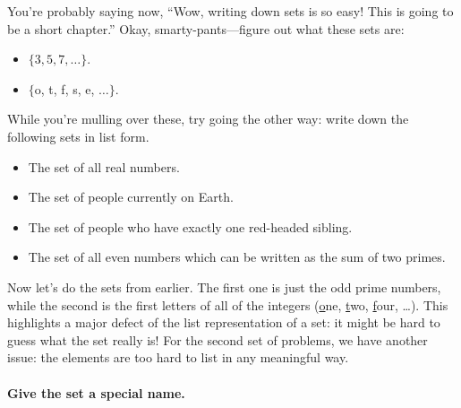 \documentclass{tufte-book}
\begin{document}
You're probably saying now, ``Wow, writing down sets is so easy! This is going to be a short chapter.'' Okay, smarty-pants---figure out what these sets are:
\begin{itemize}
    \item $\{3, 5, 7, \dots\}$.
    \item $\{$o, t, f, s, e, $\dots\}$.
\end{itemize}
While you're mulling over these, try going the other way: write down the following sets in list form.
\begin{itemize}
    \item The set of all real numbers.
    \item The set of people currently on Earth.
    \item The set of people who have exactly one red-headed sibling.
    \item The set of all even numbers which can be written as the sum of two primes.
\end{itemize}
Now let's do the sets from earlier. The first one is just the odd prime numbers, while the second is the first letters of all of the integers (\underline{o}ne, \underline{t}wo, \underline{f}our, \dots). This highlights a major defect of the list representation of a set: it might be hard to guess what the set really is! For the second set of problems, we have another issue: the elements are too hard to list in any meaningful way.

\paragraph{Give the set a special name.}
\label{sec:give-set-special}
\end{document}
